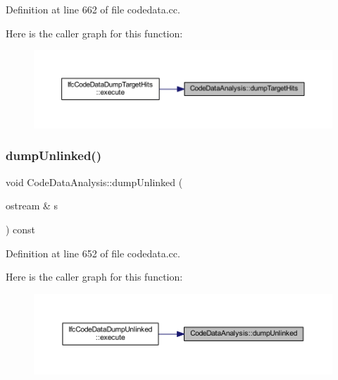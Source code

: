 Definition at line 662 of file codedata.\+cc.

Here is the caller graph for this function\+:
\nopagebreak
\begin{figure}[H]
\begin{center}
\leavevmode
\includegraphics[width=350pt]{class_code_data_analysis_af1e3bf0ac6da27639cfcd8cb22f931d6_icgraph}
\end{center}
\end{figure}
\mbox{\label{class_code_data_analysis_a1817d772abce6c94e56ce48ba36b9058}} 
\subsubsection{\texorpdfstring{dumpUnlinked()}{dumpUnlinked()}}
{\footnotesize\ttfamily void Code\+Data\+Analysis\+::dump\+Unlinked (\begin{DoxyParamCaption}\item[{ostream \&}]{s }\end{DoxyParamCaption}) const}



Definition at line 652 of file codedata.\+cc.

Here is the caller graph for this function\+:
\nopagebreak
\begin{figure}[H]
\begin{center}
\leavevmode
\includegraphics[width=350pt]{class_code_data_analysis_a1817d772abce6c94e56ce48ba36b9058_icgraph}
\end{center}
\end{figure}
\mbox{\label{class_code_data_analysis_ac296d58998c63e13db49b6164dabc21d}} 
